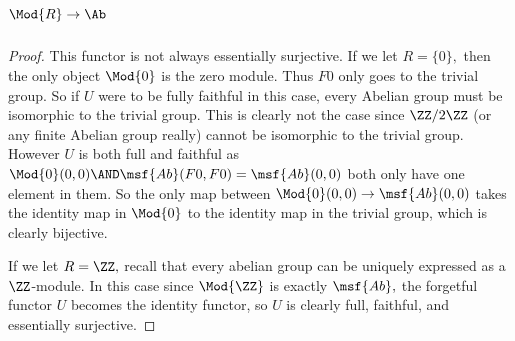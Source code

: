\documentclass[../../main]{subfiles}
\begin{document}
\subparagraph{\(\Mod{R}\to\Ab\)}
\begin{proof}
	This functor is not always essentially surjective. If we let $ R=\{0\}, $
	then the only object $ \Mod{0}$ is the zero module. Thus $ F0 $ only goes to
	the trivial group. So if $ U $ were to be fully faithful in this case, every
	Abelian group must be isomorphic to the trivial group. This is clearly not
	the case since $ \ZZ/2\ZZ $ (or any finite Abelian group really) cannot be
	isomorphic to the trivial group. However $ U $ is both full and faithful as
	$ \Mod{0}(0,0)\AND \msf{Ab}(F0,F0)=\msf{Ab}(0,0) $ both only have one
	element in them. So the only map between $ \Mod{0}(0,0)\to \msf{Ab}(0,0) $
	takes the identity map in $ \Mod{0} $ to the identity map in the trivial
	group, which is clearly bijective.

	If we let $ R=\ZZ,$ recall that every abelian group can be uniquely
	expressed as a $\ZZ$-module. In this case since $ \Mod{\ZZ} $ is exactly
	$ \msf{Ab},$ the forgetful functor $ U $ becomes the identity functor, so
	$ U $ is clearly full, faithful, and essentially surjective.


\end{proof}
\end{document}
